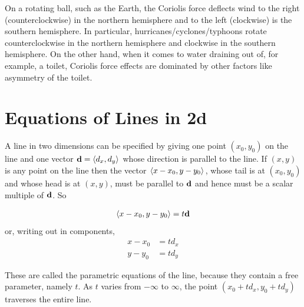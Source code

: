 On a rotating ball, such as the Earth, the Coriolis force deflects
wind to the right (counterclockwise) in the northern hemisphere
and to the left (clockwise) is the southern hemisphere. In particular,
hurricanes/cyclones/typhoons rotate counterclockwise in the northern
hemisphere and clockwise in the southern hemisphere. On the other
hand, when it comes to water draining out of, for example, a toilet,
Coriolis force effects are dominated by other factors like asymmetry 
of the toilet. 



\section{Equations of Lines in 2d}\label{sec lines 2d}
A line in two dimensions can be specified  by giving one point
$(x_0,y_0)$ on the line and one vector $\mathbf{d}=\left< d_x,d_y\right> $ 
whose direction is parallel to the line.
%
If $(x,y)$ is any point on the line then the vector $\left< x-x_0,y-y_0\right> $, 
whose tail is at $(x_0,y_0)$ and whose head is at $(x,y)$,  must be parallel
to $\mathbf{d}$ and hence must be a scalar multiple of $\mathbf{d}$. So
\begin{impeqn}\label{eqn par line}
\begin{align*}
   \left< x-x_0,y-y_0\right> =t \mathbf{d}
\end{align*}
or, writing out in components,
\begin{align*}
   x-x_0&=t d_x\\
   y-y_0&=t d_y
\end{align*}
\end{impeqn}\noindent
These are called the parametric equations of the line, because they contain
a free parameter, namely $t$. As $t$ varies from $-\infty$ to $\infty$,
the point $(x_0+td_x,y_0+td_y)$ traverses the entire line.

